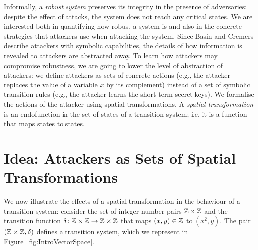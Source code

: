 Informally, a \emph{robust system} preserves its integrity in the presence of adversaries: despite the effect of attacks, the system does not reach any critical states. %
We are interested both in quantifying how robust a system is and also in the concrete strategies that attackers use when attacking the system. Since Basin and Cremers describe attackers with symbolic capabilities, 
the details of how information is revealed to attackers are abstracted away. %
To learn how attackers may compromise robustness, we are going to lower the level of abstraction of attackers: we define attackers as sets of concrete actions (e.g., the attacker replaces the value of a variable $x$ by its complement) instead of a set of symbolic transition rules (e.g., the attacker learns the short-term secret keys). We formalise the actions of the attacker using {spatial transformations}. A \emph{spatial transformation} is an endofunction in the set of states of a transition system; i.e. it is a function that maps states to states.%

\section{Idea: Attackers as Sets of Spatial Transformations}
We now illustrate the effects of a spatial transformation in the behaviour of a transition system: consider the set of integer number pairs $\mathbb{Z}\times\mathbb{Z}$ and the transition function $\delta\colon \mathbb{Z}\times\mathbb{Z}\rightarrow \mathbb{Z}\times\mathbb{Z}$ that maps $(x,y)\in \mathbb{Z}$ to $(x^2,y)$. The pair $(\mathbb{Z}\times\mathbb{Z}, \delta)$ defines a transition system, which we represent in Figure~\ref{fig:IntroVectorSpace}.

